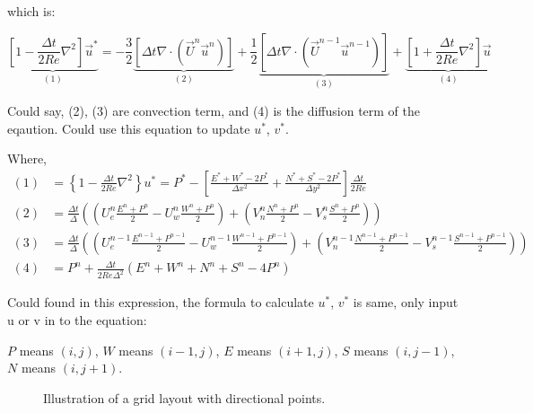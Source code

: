 \documentclass[12pt]{article}
\begin{document}
which is:


    \begin{equation}
    \underbrace{[1 - \frac{\Delta t}{2Re}\nabla^2]\vec{u}^{*}}_{(1)} 
    = 
    -\frac{3}{2} \underbrace{[\Delta t \nabla \cdot (\vec{U}^n \vec{u}^{n})]}_{(2)} 
    + \frac{1}{2} \underbrace{[\Delta t  \nabla \cdot (\vec{U}^{n-1} \vec{u}^{n-1})]}_{(3)} 
    +\underbrace{[1+ \frac{\Delta t}{2Re} \nabla^{2}] \vec{u}}_{(4)}
\end{equation}

Could say, (2), (3) are convection term, and (4) is the diffusion term of the eqaution. 
Could use this equation to update $u^*$, $v^*$.


Where,
\begin{align*}
    (1) &= \left\{ 1 - \frac{\Delta t}{2Re} \nabla^2 \right\} u^{*} = P^{*} - \left[\frac{E^{*} + W^{*} - 2P^*}{\Delta x^{2}} + \frac{N^{*} + S^{*} - 2P^*}{\Delta y^{2}}\right] \frac{\Delta t}{2Re} \\
    (2) &= \frac{\Delta t}{\Delta} \left((U_{e}^{n} \frac{ E^{n} + P^{n}}{2} - U_{w}^{n} \frac{ W^{n} + P^{n}}{2}) + (V_{n}^{n} \frac{ N^{n} + P^{n}}{2} - V_{s}^{n} \frac{ S^{n} + P^{n}}{2}) \right) \\
    (3) &= \frac{\Delta t}{\Delta} \left((U_{e}^{n-1} \frac{ E^{n-1} + P^{n-1}}{2} - U_{w}^{n-1} \frac{ W^{n-1} + P^{n-1}}{2}) + (V_{n}^{n-1} \frac{ N^{n-1} + P^{n-1}}{2} - V_{s}^{n-1} \frac{ S^{n-1} + P^{n-1}}{2}) \right) \\
    (4) &= P^n + \frac{\Delta t}{2 Re \Delta^2} \left( E^{n} + W^{n} + N^{n} + S^{n} - 4P^{n} \right)
\end{align*}


    Could found in this expression, the formula to calculate $u^*$, $v^*$ is same, only input u or v in to the equation:

    $P$ means $(i,j)$, $W$ means $(i-1,j)$, $E$ means $(i+1,j)$, $S$ means $(i,j-1)$, $N$ means $(i,j+1)$.




\begin{figure}[H]
\centering
{}
\caption{Illustration of a grid layout with directional points.}
\end{figure}
\end{document}
